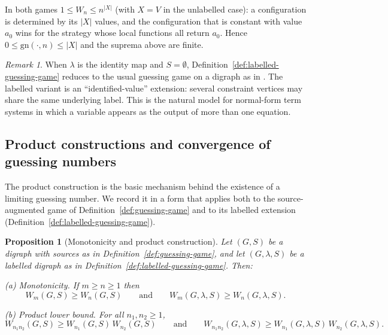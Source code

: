 \documentclass[11pt]{article}
\theoremstyle{plain}
\newtheorem{proposition}[theorem]{Proposition}
\theoremstyle{definition}
\theoremstyle{definition}
\theoremstyle{remark}
\newtheorem{remark}[theorem]{Remark}
\newcommand{\gn}{\mathrm{gn}}
\begin{document}
In both games $1\le W_n\le n^{|X|}$ (with $X=V$ in the unlabelled case): a configuration is
determined by its $|X|$ values, and the configuration that is constant with value $a_0$ wins
for the strategy whose local functions all return $a_0$.  Hence $0\le\gn(\cdot,n)\le|X|$ and
the suprema above are finite.

\begin{remark}
When $\lambda$ is the identity map and $S=\emptyset$, Definition~\ref{def:labelled-guessing-game} reduces to the
usual guessing game on a digraph as in \cite{riis2006information}.
The labelled variant is an ``identified-value'' extension: several constraint vertices may share the same
underlying label.  This is the natural model for normal-form term systems in which a variable appears as the
output of more than one equation.
\end{remark}

\subsection{Product constructions and convergence of guessing numbers}
\label{subsec:gn-convergence}

The product construction is the basic mechanism behind the existence of a limiting guessing number.
We record it in a form that applies both to the source-augmented game of Definition~\ref{def:guessing-game} and to
its labelled extension (Definition~\ref{def:labelled-guessing-game}).

\begin{proposition}[Monotonicity and product construction]
\label{prop:gn-monotone-product}
Let $(G,S)$ be a digraph with sources as in Definition~\ref{def:guessing-game}, and let $(G,\lambda,S)$ be a labelled
digraph as in Definition~\ref{def:labelled-guessing-game}.
Then:

\smallskip
\noindent\textup{(a) Monotonicity.}
If $m\ge n\ge 1$ then
\[
  W_m(G,S)\ge W_n(G,S)
  \qquad\text{and}\qquad
  W_m(G,\lambda,S)\ge W_n(G,\lambda,S).
\]

\smallskip
\noindent\textup{(b) Product lower bound.}
For all $n_1,n_2\ge 1$,
\[
  W_{n_1n_2}(G,S)\ge W_{n_1}(G,S)\,W_{n_2}(G,S)
  \qquad\text{and}\qquad
  W_{n_1n_2}(G,\lambda,S)\ge W_{n_1}(G,\lambda,S)\,W_{n_2}(G,\lambda,S).
\]
\end{proposition}
\end{document}

